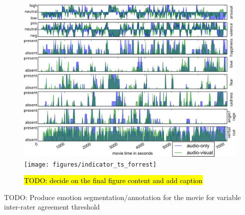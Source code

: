 \begin{figure}
  \centering
  \includegraphics[width=\linewidth]{figures/indicator_ts_allchar}\\
  \texttt{[image: figures/indicator\_ts\_forrest]}
  \caption{\hl{TODO: decide on the final figure content and add caption}}
  \label{fig:indicatortsallchar}
\end{figure}


TODO: Produce emotion segmentation/annotation for the movie for variable inter-rater agreement threshold
